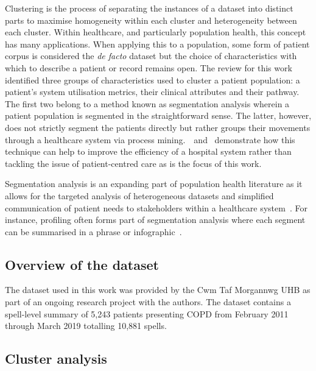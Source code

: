 Clustering is the process of separating the instances of a dataset into distinct
parts to maximise homogeneity within each cluster and heterogeneity between each
cluster. Within healthcare, and particularly population health, this concept has
many applications. When applying this to a population, some form of patient
corpus is considered the \emph{de facto} dataset but the choice of
characteristics with which to describe a patient or record remains open. The
review for this work identified three groups of characteristics used to cluster
a patient population: a patient's system utilisation metrics, their clinical
attributes and their pathway. The first two belong to a method known as
segmentation analysis wherein a patient population is segmented in the
straightforward sense. The latter, however, does not strictly segment the
patients directly but rather groups their movements through a healthcare system
via process mining.~\cite{AG2018}~and~\cite{DDGM+12015} demonstrate how this
technique can help to improve the efficiency of a hospital system rather than
tackling the issue of patient-centred care as is the focus of this work.

Segmentation analysis is an expanding part of population health literature as it
allows for the targeted analysis of heterogeneous datasets and simplified
communication of patient needs to stakeholders within a healthcare
system~\cite{VMD2016review, YKTT+12018}. For instance, profiling often forms
part of segmentation analysis where each segment can be summarised in a phrase
or infographic~\cite{VMD2016, YSKT+42019}.


\subsection{Overview of the dataset}\label{subsec:overview}

The dataset used in this work was provided by the Cwm Taf Morgannwg UHB as part
of an ongoing research project with the authors. The dataset contains a
spell-level summary of 5,243 patients presenting COPD from February 2011 through
March 2019 totalling 10,881 spells. 

\subsection{Cluster analysis}\label{subsec:clusters}

